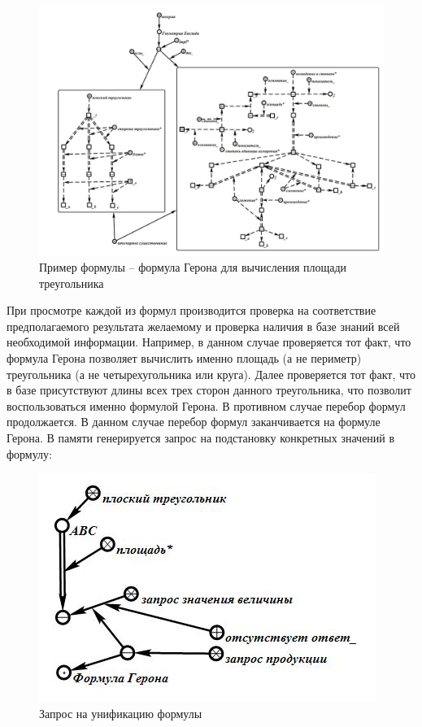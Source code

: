 \begin{figure}[H]
	\includegraphics[scale=0.5]{images/part7/chapter_learning_systems/step4.jpg}
	\caption{Пример формулы -- формула Герона для вычисления площади треугольника}
	\label{fig:step4}
\end{figure}

При просмотре каждой из формул производится проверка на соответствие предполагаемого результата желаемому и проверка наличия в базе знаний всей необходимой информации. Например, в данном случае проверяется тот факт, что формула Герона позволяет вычислить именно площадь (а не периметр) треугольника (а не четырехугольника или круга). Далее проверяется тот факт, что в базе присутствуют длины всех трех сторон данного треугольника, что позволит воспользоваться именно формулой Герона. В противном случае перебор формул продолжается. В данном случае перебор формул заканчивается на формуле Герона. В памяти генерируется запрос на подстановку конкретных значений в формулу:

\begin{figure}[H]
	\includegraphics[scale=0.5]{images/part7/chapter_learning_systems/step5.jpg}
	\caption{Запрос на унификацию формулы}
	\label{fig:step5}
\end{figure}

